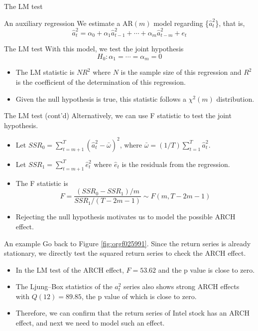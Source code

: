 \documentclass[presentation,10pt]{beamer}
\begin{document}
\begin{frame}[label={sec:org00015b3}]{The LM test}
\begin{block}{An auxiliary regression}
We estimate a AR\((m)\) model regarding \{\(\hat{a}^2_t\)\}, that is,
\[ \hat{a}^2_t = \alpha_0 + \alpha_1 \hat{a}_{t-1}^2 + \cdots +
\alpha_m \hat{a}^2_{t-m} + e_t \]
\end{block}

\begin{block}{The LM test}
With this model, we test the joint hypothesis
\[H_0: \alpha_1 = \cdots = \alpha_m = 0 \]
\begin{itemize}
\item The LM statistic is \(NR^2\) where \(N\) is the sample size of this
regression and \(R^2\) is the coefficient of the determination of this
regression.
\item Given the null hypothesis is true, this statistic follows
a \(\chi^2(m)\) distribution.
\end{itemize}
\end{block}
\end{frame}

\begin{frame}[label={sec:org38d59b5}]{The LM test (cont'd)}
Alternatively, we can use F statistic to test the joint
hypothesis.
\begin{itemize}
\item Let \(SSR_0 = \sum_{t=m+1}^{T} (\hat{a}^2_{t} -
  \bar{\omega})^2\), where \(\bar{\omega} = (1/T) \sum_{t=1}^T
  \hat{a}^2_t\).
\item Let \(SSR_1 = \sum_{t=m+1}^T \hat{e}^2_t\) where \(\hat{e}_t\) is the
residuals from the regression.
\item The F statistic is
\[F = \frac{(SSR_0 - SSR_1)/m}{SSR_1/(T-2m-1)} \sim F(m, T-2m-1)\]
\item Rejecting the null hypothesis motivates us to model the possible
ARCH effect.
\end{itemize}
\end{frame}

\begin{frame}[label={sec:org59046c4}]{An example}
Go back to Figure \ref{fig:orgf025991}. Since the return series is
already stationary, we directly test the squared return series to
check the ARCH effect.

\begin{itemize}
\item In the LM test of the ARCH effect, \(F = 53.62\) and the p value is
close to zero.
\item The Ljung–Box statistics of the \(a^2_t\) series also
shows strong ARCH effects with \(Q(12) = 89.85\), the p value of which is
close to zero.
\item Therefore, we can confirm that the return series of
Intel stock has an ARCH effect, and next we need to model such an
effect.
\end{itemize}
\end{frame}
\end{document}
